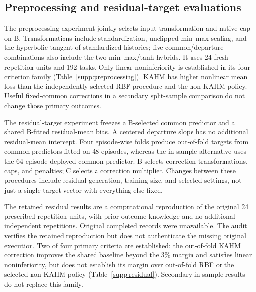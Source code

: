 \begin{table}[htbp]\centering\small
\caption{Complete six-comparison family for dimension-selected residual forecasting. Gain is $100(1-L_K/L_m)$. A positive adjusted lower endpoint establishes the specified margin. These results are separate from the representation-only comparison.}\label{supp:dimension}
\end{table}
\FloatBarrier

\subsection{Preprocessing and residual-target evaluations}
The preprocessing experiment jointly selects input transformation and native cap on B. Transformations include standardization, unclipped min--max scaling, and the hyperbolic tangent of standardized histories; five common/departure combinations also include the two min--max/tanh hybrids. It uses 24 fresh repetition units and 192 tasks. Only linear noninferiority is established in its four-criterion family (Table~\ref{supp:preprocessing}). KAHM has higher nonlinear mean loss than the independently selected RBF procedure and the non-KAHM policy. Useful fixed-common corrections in a secondary split-sample comparison do not change those primary outcomes.

The residual-target experiment freezes a B-selected common predictor and a shared B-fitted residual-mean bias. A centered departure slope has no additional residual-mean intercept. Four episode-wise folds produce out-of-fold targets from common predictors fitted on 48 episodes, whereas the in-sample alternative uses the 64-episode deployed common predictor. B selects correction transformations, caps, and penalties; C selects a correction multiplier. Changes between these procedures include residual generation, training size, and selected settings, not just a single target vector with everything else fixed.

The retained residual results are a computational reproduction of the original 24 prescribed repetition units, with prior outcome knowledge and no additional independent repetitions. Original completed records were unavailable. The audit verifies the retained reproduction but does not authenticate the missing original execution. Two of four primary criteria are established: the out-of-fold KAHM correction improves the shared baseline beyond the 3\% margin and satisfies linear noninferiority, but does not establish its margin over out-of-fold RBF or the selected non-KAHM policy (Table~\ref{supp:residual}). Secondary in-sample results do not replace this family.

